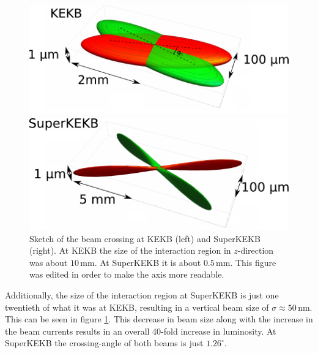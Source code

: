 \documentclass[a4paper,11pt,twosided,final,german,openbib,pdftex,listof=totoc,bibliography=totoc]{scrbook}
\begin{document}
\begin{figure}[h!]
	\centering
	\begin{minipage}[b]{0.45\linewidth}
		\centering
		\includegraphics[width=\textwidth]{Bilder/BeamBelle}
	\end{minipage}
	\hspace{0.5cm}
	\begin{minipage}[b]{0.45\linewidth}
		\centering
		\includegraphics[width=\textwidth]{Bilder/SuperKEKBBeam}
	\end{minipage}
		\caption[Sketch Of The Beam Crossing For KEKB And SuperKEKB]{Sketch of the beam crossing at KEKB (left) and SuperKEKB (right). At KEKB the size of the interaction region in $z$-direction was about $10\,\textrm{mm}$. At SuperKEKB it is about $0.5\,\textrm{mm}$.\cite{Beamsize} This figure was edited in order to make the axis more readable.}
	\label{fig:beamsize}

\end{figure}


Additionally, the size of the interaction region at SuperKEKB is just one twentieth of what it was at KEKB, resulting in a vertical beam size of $\sigma \approx 50\,\textrm{nm} $. This can be seen in figure \ref{fig:beamsize}. This decrease in beam size along with the increase in the beam currents results in an overall 40-fold increase in luminosity.  \cite{B2TR} \cite{B2B}
At SuperKEKB the crossing-angle of both beams is just $1.26^{\circ}$.
\end{document}
